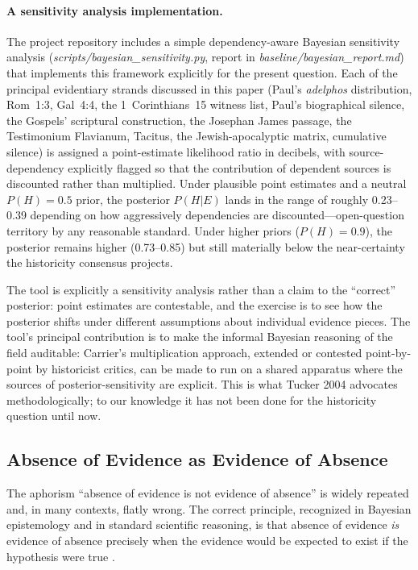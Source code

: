 \documentclass[12pt,oneside]{article}
\begin{document}
\paragraph{A sensitivity analysis implementation.}
The project repository includes a simple dependency-aware Bayesian
sensitivity analysis (\textit{scripts/bayesian\_sensitivity.py},
report in \textit{baseline/bayesian\_report.md}) that implements
this framework explicitly for the present question.  Each of the
principal evidentiary strands discussed in this paper
(Paul's \textit{adelphos} distribution, Rom~1:3, Gal~4:4, the
1~Corinthians~15 witness list, Paul's biographical silence, the
Gospels' scriptural construction, the Josephan James passage, the
Testimonium Flavianum, Tacitus, the Jewish-apocalyptic matrix,
cumulative silence) is assigned a point-estimate likelihood ratio
in decibels, with source-dependency explicitly flagged so that the
contribution of dependent sources is discounted rather than
multiplied.  Under plausible point estimates and a neutral
$P(H)=0.5$ prior, the posterior $P(H|E)$ lands in the range of
roughly 0.23--0.39 depending on how aggressively dependencies are
discounted---open-question territory by any reasonable standard.
Under higher priors ($P(H)=0.9$), the posterior remains higher
(0.73--0.85) but still materially below the near-certainty the
historicity consensus projects.

The tool is explicitly a sensitivity analysis rather than a
claim to the ``correct'' posterior: point estimates are
contestable, and the exercise is to see how the posterior shifts
under different assumptions about individual evidence pieces.  The
tool's principal contribution is to make the informal Bayesian
reasoning of the field auditable: Carrier's \citeyear{Carrier2014}
multiplication approach, extended or contested point-by-point by
historicist critics, can be made to run on a shared apparatus
where the sources of posterior-sensitivity are explicit.  This is
what Tucker 2004 advocates methodologically; to our knowledge it
has not been done for the historicity question until now.

\subsection{Absence of Evidence as Evidence of Absence}
\label{sec:method:silence}

The aphorism ``absence of evidence is not evidence of absence'' is
widely repeated and, in many contexts, flatly wrong.  The correct
principle, recognized in Bayesian epistemology and in standard
scientific reasoning, is that absence of evidence \textit{is} evidence
of absence precisely when the evidence would be expected to exist if the
hypothesis were true \citep{Sober2009,Carrier2012}.
\end{document}
